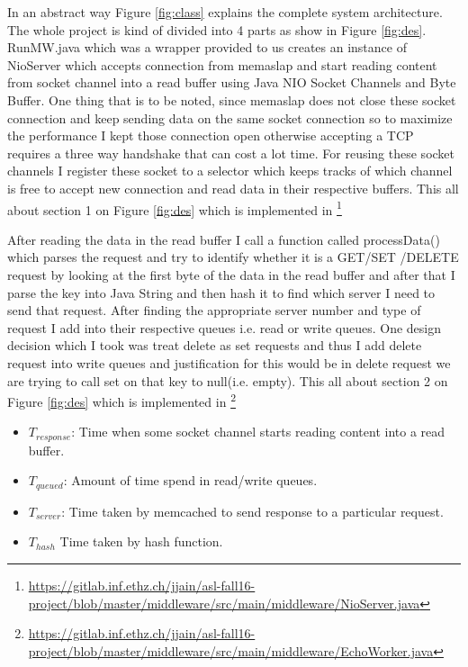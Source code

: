 \documentclass[11pt]{article}
\begin{document}
In an abstract way Figure \ref{fig:class} explains the complete system architecture. The whole project is kind of divided into 4 parts as show in Figure \ref{fig:des}. RunMW.java which was a wrapper provided to us creates an instance of NioServer which accepts connection from memaslap and start reading content from socket channel into a read buffer using Java NIO Socket Channels and Byte Buffer. One thing that is to be noted, since memaslap does not close these socket connection and keep sending data on the same socket connection so to maximize the performance I kept those connection open otherwise accepting a TCP requires a three way handshake that can cost a lot time. For reusing these socket channels I register these socket to a selector which keeps tracks of which channel is free to accept new connection and read data in their respective buffers. This all about section 1 on Figure \ref{fig:des} which is implemented in \footnote{\url{https://gitlab.inf.ethz.ch/jjain/asl-fall16-project/blob/master/middleware/src/main/middleware/NioServer.java}} 

After reading the data in the read buffer I call a function called processData() which parses the request and try to identify whether it is a GET/SET /DELETE request by looking at the first byte of the data in the read buffer and after that I parse the key into Java String and then hash it to find which server I need to send that request. After finding the appropriate server number and type of request I add into their respective queues i.e. read or write queues. One design decision which I took was treat delete as set requests and thus I add delete request into write queues and justification for this would be in delete request we are trying to call set on that key to null(i.e. empty). This all about section 2 on  Figure \ref{fig:des} which is implemented in \footnote{\url{https://gitlab.inf.ethz.ch/jjain/asl-fall16-project/blob/master/middleware/src/main/middleware/EchoWorker.java}}

\begin{itemize}
	\item $T_{response}$: Time when some socket channel starts reading content into a read buffer.
	\item $T_{queued}$: Amount of time spend in read/write queues.
	\item $T_{server}$: Time taken by memcached to send response to a particular request.
	\item $T_{hash}$ Time taken by hash function.
\end{itemize}
\end{document}
